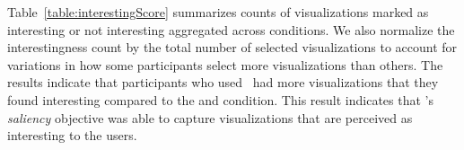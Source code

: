 Table~\ref{table:interestingScore} summarizes counts of visualizations marked as interesting or not interesting aggregated across conditions. We also normalize the interestingness count by the total number of selected visualizations to account for variations in how some participants select more visualizations than others. The results indicate that participants who used \system\ had more visualizations that they found interesting compared to the \BFS and \cluster condition. This result indicates that \system's \textit{saliency} objective was able to capture visualizations that are perceived as interesting to the users. 
